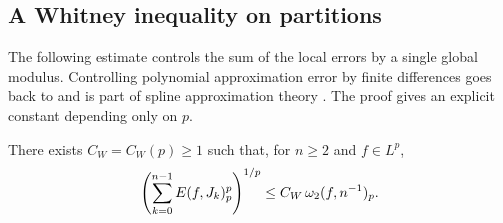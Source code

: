 \documentclass[11pt,a4paper]{article}
\begin{document}
\subsection{A Whitney inequality on partitions}

The following estimate controls the sum of the local errors by a single global modulus. Controlling polynomial approximation error by finite differences goes back to \citet{artigo_2-whitney1957} and is part of spline approximation theory \citep{artigo_2-devorelorentz1993}. The proof gives an explicit constant depending only on $p$.

\begin{lema}
\label{lp:lem:whitney}
There exists $C_W=C_W(p)\ge1$ such that, for $n\ge2$ and $f\in L^p$,
\begin{equation}
 \left(\sum_{k=0}^{n-1}E(f,J_k)_p^p\right)^{1/p}
 \le C_W\,\omega_2(f,n^{-1})_{p}.
 \label{lp:eq:whitney-partition}
\end{equation}
\end{lema}
\end{document}
